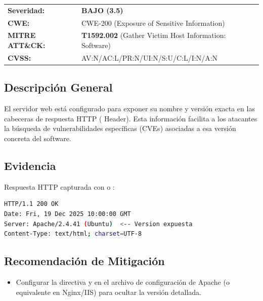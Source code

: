 \documentclass[a4paper]{article}
\newcommand{\maquinaID}{MAWB} %
\begin{document}
\begin{tcolorbox}[colback=white, colframe=riskLow, title=\textbf{Hallazgo VULN-\maquinaID-04: Divulgación de Versión del Servidor}]
    \begin{tabularx}{\textwidth}{lX}

        \textbf{Severidad:} & 
        \textcolor{riskLow}{\textbf{BAJO (3.5)}} \\

        \textbf{CWE:} & 
        CWE-200 (Exposure of Sensitive Information) \\

        \textbf{MITRE ATT\&CK:} & 
        \textbf{T1592.002} (Gather Victim Host Information: Software) \\

        \textbf{CVSS:} & 
        AV:N/AC:L/PR:N/UI:N/S:U/C:L/I:N/A:N \\
    \end{tabularx}
\end{tcolorbox}

\subsection*{Descripción General}
El servidor web está configurado para exponer su nombre y versión exacta en las cabeceras de respuesta HTTP ( Header). Esta información facilita a los atacantes la búsqueda de vulnerabilidades específicas (CVEs) asociadas a esa versión concreta del software.

\subsection*{Evidencia}
Respuesta HTTP capturada con  o :

\begin{lstlisting}[language=bash, caption=Cabecera Server expuesta]
HTTP/1.1 200 OK
Date: Fri, 19 Dec 2025 10:00:00 GMT
Server: Apache/2.4.41 (Ubuntu)  <-- Version expuesta
Content-Type: text/html; charset=UTF-8
\end{lstlisting}

\subsection*{Recomendación de Mitigación}
\begin{itemize}
    \item Configurar la directiva  y  en el archivo de configuración de Apache (o equivalente en Nginx/IIS) para ocultar la versión detallada.
\end{itemize}
\end{document}
